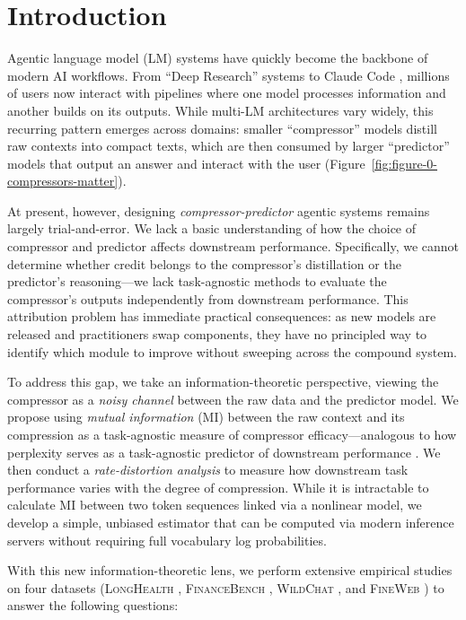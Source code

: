 \documentclass{article} %
\begin{document}
\section{Introduction}\label{introduction}
Agentic language model (LM) systems have quickly become the backbone of modern AI workflows. From ``Deep Research'' systems \citep{hadfield2025multiagent} to 
Claude Code \citep{anthropic2025claude37}, 
millions of users now interact with pipelines where one model processes information and another builds on its outputs. 
While multi-LM architectures vary widely, this recurring pattern emerges across domains: smaller ``compressor'' models distill raw contexts into compact texts, which are then consumed by larger ``predictor'' models that output an answer and interact with the user (Figure~\ref{fig:figure-0-compressors-matter}).

At present, however, designing \emph{compressor-predictor} agentic systems remains largely trial-and-error. We lack a basic understanding of how the choice of compressor and predictor affects downstream performance.
Specifically, we cannot determine whether credit belongs to the compressor's distillation or the predictor's reasoning---we lack task-agnostic methods to evaluate the compressor's outputs independently from downstream performance. This attribution problem has immediate practical consequences: as new models are released and practitioners swap components, they have no principled way to identify which module to improve without sweeping across the compound system.

To address this gap, we take an information-theoretic perspective, viewing the compressor as a \emph{noisy channel} between the raw data and the predictor model. We propose using \emph{mutual information} (MI) between the raw context and its compression as a task-agnostic measure of compressor efficacy---analogous to how perplexity serves as a task-agnostic predictor of downstream performance \citep{scalinglaws, hoffmann2022empirical}. We then conduct a \emph{rate-distortion analysis} to measure how downstream task performance varies with the degree of compression. While it is intractable to calculate MI between two token sequences linked via a nonlinear model, we develop a simple, unbiased estimator that can be computed via modern inference servers without requiring full vocabulary log probabilities.

With this new information-theoretic lens, we perform extensive empirical studies on four datasets (\textsc{LongHealth} \citep{adams2024longhealth}, \textsc{FinanceBench} \citep{islam2023financebench}, \textsc{WildChat} \citep{zhao2024wildchat}, and \textsc{FineWeb} \citep{penedo2024the}) to answer the following questions:
\end{document}
